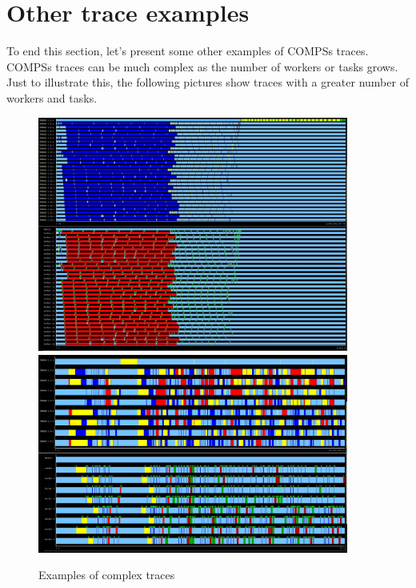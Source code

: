 \section{Other trace examples}
\label{sec:OtherExamples}

To end this section, let’s present some other examples of COMPSs traces. COMPSs traces can be 
much complex as the number of workers or tasks grows. Just to illustrate this, the following 
pictures show traces with a greater number of workers and tasks.

\begin{figure}[ht!]
  \centering
    \includegraphics[width=0.91\textwidth]{./Sections/6_Other_Examples/Figures/16.jpeg}
    \includegraphics[width=0.91\textwidth]{./Sections/6_Other_Examples/Figures/16_2.jpeg}
    \caption{Examples of complex traces}
\end{figure}

